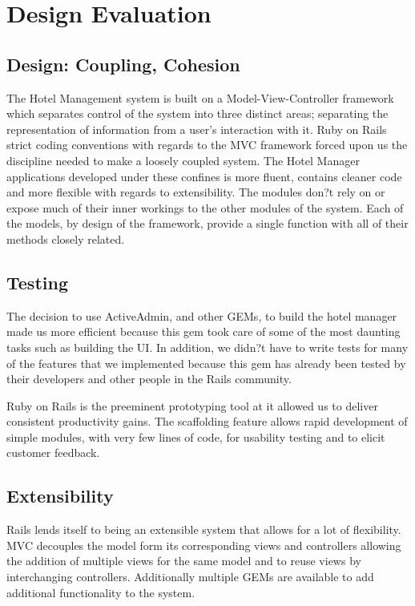 \documentclass[12pt]{elsarticle}
\begin{document}
\section{Design Evaluation}

\subsection{Design: Coupling, Cohesion}

The Hotel Management system is built on a Model-View-Controller framework which separates control of the system into three distinct areas; separating the representation of information from a user's interaction with it. Ruby on Rails strict coding conventions with regards to the MVC framework forced upon us the discipline needed to make a loosely coupled system. The Hotel Manager applications developed under these confines is more fluent, contains cleaner code and more flexible with regards to extensibility. The modules don?t rely on or expose much of their inner workings to the other modules of the system. Each of the models, by design of the framework, provide a single function with all of their methods closely related.

\subsection{Testing}
The decision to use ActiveAdmin, and other GEMs, to build the hotel manager made us more efficient because this gem took care of some of the most daunting tasks such as building the UI. In addition, we didn?t have to write tests for many of the features that we implemented because this gem has already been tested by their developers and other people in the Rails community.

Ruby on Rails is the preeminent prototyping tool at it allowed us to deliver consistent productivity gains. The scaffolding feature allows rapid development of simple modules, with very few lines of code, for usability testing and to elicit customer feedback.

\subsection{Extensibility}

Rails lends itself to being an extensible system that allows for a lot of flexibility. MVC decouples the model form its corresponding views and controllers allowing the addition of multiple views for the same model and to reuse views by interchanging controllers. Additionally multiple GEMs are available to add additional functionality to the system.
\end{document}
